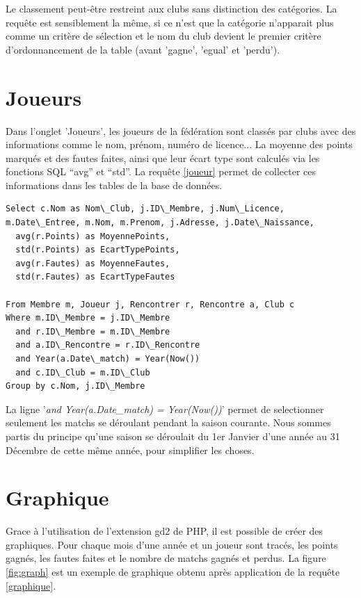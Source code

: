 \documentclass[a4paper»,8pt,french,fleqn]{report}
\begin{document}
Le classement peut-être restreint aux clubs sans distinction des catégories. La requête est sensiblement la même, si ce n'est que la catégorie n'apparait plus comme un critère de sélection et le nom du club devient le premier critère d'ordonnancement de la table (avant 'gagne', 'egual' et 'perdu'). 


\section{Joueurs}
Dans l'onglet 'Joueurs', les joueurs de la fédération sont classés par clubs avec des informations comme le nom, prénom, numéro de licence... La moyenne des points marqués et des fautes faites, ainsi que leur écart type sont calculés via les fonctions SQL ``avg'' et ``std''. La requête \ref{joueur} permet de collecter ces informations dans les tables de la base de données.

\begin{lstlisting}
Select c.Nom as Nom\_Club, j.ID\_Membre, j.Num\_Licence, m.Date\_Entree, m.Nom, m.Prenom, j.Adresse, j.Date\_Naissance,
  avg(r.Points) as MoyennePoints,
  std(r.Points) as EcartTypePoints,
  avg(r.Fautes) as MoyenneFautes,
  std(r.Fautes) as EcartTypeFautes

From Membre m, Joueur j, Rencontrer r, Rencontre a, Club c
Where m.ID\_Membre = j.ID\_Membre
  and r.ID\_Membre = m.ID\_Membre
  and a.ID\_Rencontre = r.ID\_Rencontre
  and Year(a.Date\_match) = Year(Now())
  and c.ID\_Club = m.ID\_Club
Group by c.Nom, j.ID\_Membre
\end{lstlisting}

La ligne '\textit{and Year(a.Date\_match) = Year(Now())}' permet de selectionner seulement les matchs se déroulant pendant la saison courante. Nous sommes partis du principe qu'une saison se déroulait du 1er Janvier d'une année au 31 Décembre de cette même année, pour simplifier les choses.


\section{Graphique}
Grace à l'utilisation de l'extension gd2 de PHP, il est possible de créer des graphiques. Pour chaque mois d'une année et un joueur sont tracés, les points gagnés, les fautes faites et le nombre de matchs gagnés et perdus. La figure \ref{fig:graph} est un exemple de graphique obtenu après application de la requête \ref{graphique}.
\end{document}
